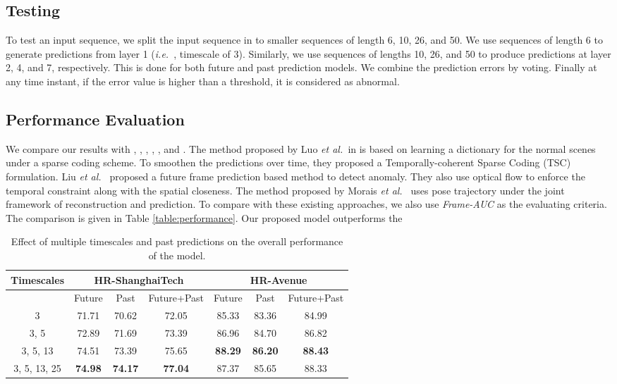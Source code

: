 \documentclass[conference]{IEEEtran}
\def\ie{\emph{i.e.~}}
\def\etal{\emph{et al.~}}
\begin{document}
\subsection{Testing}
To test an input sequence, we split the input sequence in to smaller sequences of length 6, 10, 26, and 50. We use sequences of length 6 to generate predictions from layer 1 (\ie, timescale of 3). Similarly, we use sequences of lengths 10, 26, and 50 to produce predictions at layer 2, 4, and 7, respectively. This is done for both future and past prediction models. We combine the prediction errors by voting. Finally at any time instant, if the error value is higher than a threshold, it is considered as abnormal. 


\subsection{Performance Evaluation}
We compare our results with \cite{TSC-RNN}, \cite{future}, \cite{hasan2016}, \cite{unmask}, \cite{novelty}, and \cite{pose}. The method proposed by Luo \etal in \cite{TSC-RNN} is based on learning a dictionary for the normal scenes under a sparse coding scheme. To smoothen the predictions over time, they proposed a Temporally-coherent Sparse Coding (TSC) formulation. Liu \etal \cite{future} proposed a future frame prediction based method to detect anomaly. They also use optical flow to enforce the temporal constraint along with the spatial closeness. The method proposed by Morais \etal \cite{pose} uses pose trajectory under the joint framework of reconstruction and prediction. To compare with these existing approaches, we also use \textit{Frame-AUC} as the evaluating criteria. The comparison is given in Table \ref{table:performance}. Our proposed model outperforms the
\begin{table*}[]
\def\arraystretch{1.5}

\centering
\begin{tabular}{|c|c|c|c|c|c|c|}
\hline
Timescales   & \multicolumn{3}{c|}{HR-ShanghaiTech} & \multicolumn{3}{c|}{HR-Avenue} \\ \hline
             & Future    & Past     & Future+Past   & Future  & Past   & Future+Past \\ \hline
3            & 71.71     & 70.62    & 72.05         & 85.33   & 83.36  & 84.99       \\ \hline
3, 5         & 72.89     & 71.69    & 73.39         & 86.96   & 84.70  & 86.82       \\ \hline
3, 5, 13     & 74.51     & 73.39    & 75.65         & \textbf{88.29}   & \textbf{86.20}  & \textbf{88.43}       \\ \hline
3, 5, 13, 25 & \textbf{74.98}     & \textbf{74.17}    & \textbf{77.04}         & 87.37   & 85.65  & 88.33       \\ \hline

\end{tabular}


\vspace{10pt}
\caption{Effect of multiple timescales and past predictions on the overall performance of the model.}
\label{table:scale}
\end{table*}
\end{document}
